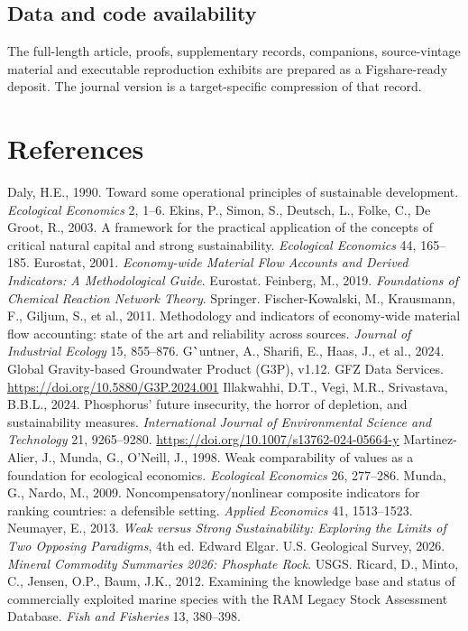 \documentclass[11pt]{article}
\begin{document}
\subsection{Data and code availability}
The full-length article, proofs, supplementary records, companions, source-vintage material and executable reproduction exhibits are prepared as a Figshare-ready deposit. The journal version is a target-specific compression of that record.
\section{References}
Daly, H.E., 1990. Toward some operational principles of sustainable development. \emph{Ecological Economics} 2, 1--6.
Ekins, P., Simon, S., Deutsch, L., Folke, C., De Groot, R., 2003. A framework for the practical application of the concepts of critical natural capital and strong sustainability. \emph{Ecological Economics} 44, 165--185.
Eurostat, 2001. \emph{Economy-wide Material Flow Accounts and Derived Indicators: A Methodological Guide}. Eurostat.
Feinberg, M., 2019. \emph{Foundations of Chemical Reaction Network Theory}. Springer.
Fischer-Kowalski, M., Krausmann, F., Giljum, S., et al., 2011. Methodology and indicators of economy-wide material flow accounting: state of the art and reliability across sources. \emph{Journal of Industrial Ecology} 15, 855--876.
G\``untner, A., Sharifi, E., Haas, J., et al., 2024. Global Gravity-based Groundwater Product (G3P), v1.12. GFZ Data Services. \url{https://doi.org/10.5880/G3P.2024.001}
Illakwahhi, D.T., Vegi, M.R., Srivastava, B.B.L., 2024. Phosphorus' future insecurity, the horror of depletion, and sustainability measures. \emph{International Journal of Environmental Science and Technology} 21, 9265--9280. \url{https://doi.org/10.1007/s13762-024-05664-y}
Martinez-Alier, J., Munda, G., O'Neill, J., 1998. Weak comparability of values as a foundation for ecological economics. \emph{Ecological Economics} 26, 277--286.
Munda, G., Nardo, M., 2009. Noncompensatory/nonlinear composite indicators for ranking countries: a defensible setting. \emph{Applied Economics} 41, 1513--1523.
Neumayer, E., 2013. \emph{Weak versus Strong Sustainability: Exploring the Limits of Two Opposing Paradigms}, 4th ed. Edward Elgar.
U.S. Geological Survey, 2026. \emph{Mineral Commodity Summaries 2026: Phosphate Rock}. USGS.
Ricard, D., Minto, C., Jensen, O.P., Baum, J.K., 2012. Examining the knowledge base and status of commercially exploited marine species with the RAM Legacy Stock Assessment Database. \emph{Fish and Fisheries} 13, 380--398.
\end{document}
